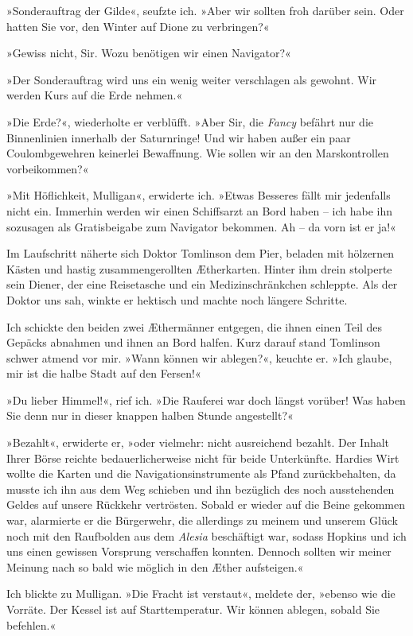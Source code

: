 »Sonderauftrag der Gilde«, seufzte ich. »Aber wir sollten froh
darüber sein. Oder hatten Sie vor, den Winter auf Dione zu
verbringen?«

»Gewiss nicht, Sir. Wozu benötigen wir einen Navigator?«

»Der Sonderauftrag wird uns ein wenig weiter verschlagen als
gewohnt. Wir werden Kurs auf die Erde nehmen.«

»Die Erde?«, wiederholte er verblüfft. »Aber Sir, die \emph{Fancy}
befährt nur die Binnenlinien innerhalb der Saturnringe! Und wir
haben außer ein paar Coulombgewehren keinerlei Bewaffnung. Wie
sollen wir an den Marskontrollen vorbeikommen?«

»Mit Höflichkeit, Mulligan«, erwiderte ich. »Etwas Besseres fällt
mir jedenfalls nicht ein. Immerhin werden wir einen Schiffsarzt an
Bord haben – ich habe ihn sozusagen als Gratisbeigabe zum Navigator
bekommen. Ah – da vorn ist er ja!«

Im Laufschritt näherte sich Doktor Tomlinson dem Pier, beladen mit
hölzernen Kästen und hastig zusammengerollten Ætherkarten. Hinter
ihm drein stolperte sein Diener, der eine Reisetasche und ein
Medizinschränkchen schleppte. Als der Doktor uns sah, winkte er
hektisch und machte noch längere Schritte.

Ich schickte den beiden zwei Æthermänner entgegen, die ihnen einen
Teil des Gepäcks abnahmen und ihnen an Bord halfen. Kurz darauf
stand Tomlinson schwer atmend vor mir. »Wann können wir ablegen?«,
keuchte er. »Ich glaube, mir ist die halbe Stadt auf den Fersen!«

»Du lieber Himmel!«, rief ich. »Die Rauferei war doch längst
vorüber! Was haben Sie denn nur in dieser knappen halben Stunde
angestellt?«

»Bezahlt«, erwiderte er, »oder vielmehr: nicht ausreichend bezahlt.
Der Inhalt Ihrer Börse reichte bedauerlicherweise nicht für beide
Unterkünfte. Hardies Wirt wollte die Karten und die
Navigationsinstrumente als Pfand zurückbehalten, da musste ich ihn
aus dem Weg schieben und ihn bezüglich des noch ausstehenden Geldes
auf unsere Rückkehr vertrösten. Sobald er wieder auf die Beine
gekommen war, alarmierte er die Bürgerwehr, die allerdings zu
meinem und unserem Glück noch mit den Raufbolden aus dem
\emph{Alesia} beschäftigt war, sodass Hopkins und ich uns einen
gewissen Vorsprung verschaffen konnten. Dennoch sollten wir meiner
Meinung nach so bald wie möglich in den Æther aufsteigen.«

Ich blickte zu Mulligan. »Die Fracht ist verstaut«, meldete der,
»ebenso wie die Vorräte. Der Kessel ist auf Starttemperatur. Wir
können ablegen, sobald Sie befehlen.«

